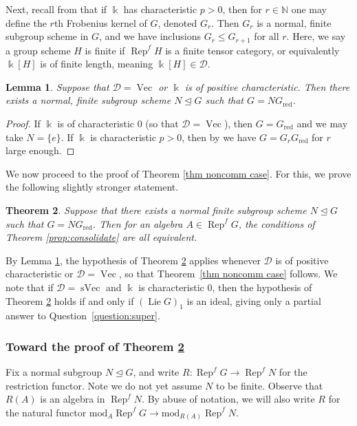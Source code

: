 \documentclass[11pt]{amsart}
\def\N{\mathbb{N}}
\def\Ds{\mathscr{D}}
\def\bk{\Bbbk}
\def\mod{\mathrm{ mod}}
\def\Rep{\operatorname{Rep}}
\def\Vec{\operatorname{Vec}}
\def\sVec{\operatorname{sVec}}
\newtheorem{thm}{Theorem}[section]
\newtheorem{lemma}[thm]{Lemma}
\theoremstyle{definition}
\theoremstyle{remark}
\numberwithin{equation}{section}
\begin{document}
Next, recall from \cite[\S 4]{CS} that if $\Bbbk$ has characteristic $p>0$, then for $r\in\N$ one may define the $r$th Frobenius kernel of $G$, denoted $G_r$. Then $G_r$ is a normal, finite subgroup scheme in $G$, and we have inclusions $G_{r}\leq G_{r+1}$ for all $r$.  Here, we say a group scheme $H$ is finite if $\Rep^f H$ is a finite tensor category, or equivalently $\Bbbk[H]$ is of finite length, meaning $\bk[H]\in\Ds$.

\begin{lemma}\label{lemma finite normal sub}
    Suppose that $\Ds=\Vec$ or $\Bbbk$ is of positive characteristic.  Then there exists a normal, finite subgroup scheme $N\trianglelefteq G$ such that $G=NG_{\mathrm{red}}$.
\end{lemma}

\begin{proof}
    If $\Bbbk$ is of characteristic 0 (so that $\Ds=\Vec$), then $G=G_{\mathrm{red}}$ and we may take $N=\{e\}$.   If $\Bbbk$ is characteristic $p>0$, then by \cite[Cor.~4.24]{CS} we have $G=G_rG_{\mathrm{red}}$ for $r$ large enough.
\end{proof}

We now proceed to the proof of Theorem \ref{thm noncomm case}.  For this, we prove the following slightly stronger statement.  

\begin{thm}\label{thm reduced finite}
Suppose that there exists a normal finite subgroup scheme $N\trianglelefteq G$ such that $G=NG_{\mathrm{red}}$.  Then for an algebra $A\in\Rep^f G$, the conditions of Theorem \ref{prop:consolidate} are all equivalent.
\end{thm}

By Lemma \ref{lemma finite normal sub}, the hypothesis of Theorem \ref{thm reduced finite} applies whenever $\Ds$ is of positive characteristic or $\Ds=\Vec$, so that Theorem~\ref{thm noncomm case} follows.  We note that if $\Ds=\sVec$ and $\Bbbk$ is characteristic 0, then the hypothesis of Theorem \ref{thm reduced finite} holds if and only if $(\operatorname{Lie}G)_1$ is an ideal, 
giving only a partial answer to Question~\ref{question:super}.

\subsubsection{Toward the proof of Theorem \ref{thm reduced finite}}

Fix a normal subgroup $N\trianglelefteq G$, and write $R:\Rep^f G\to\Rep^f N$ for the restriction functor.  Note we do not yet assume $N$ to be finite.  Observe that $R(A)$ is an algebra in $\Rep^f N$.  By abuse of notation, we will also write $R$ for the natural functor $\mod_{A}\Rep^f G\to\mod_{R(A)}\Rep^f N$.  
\end{document}

